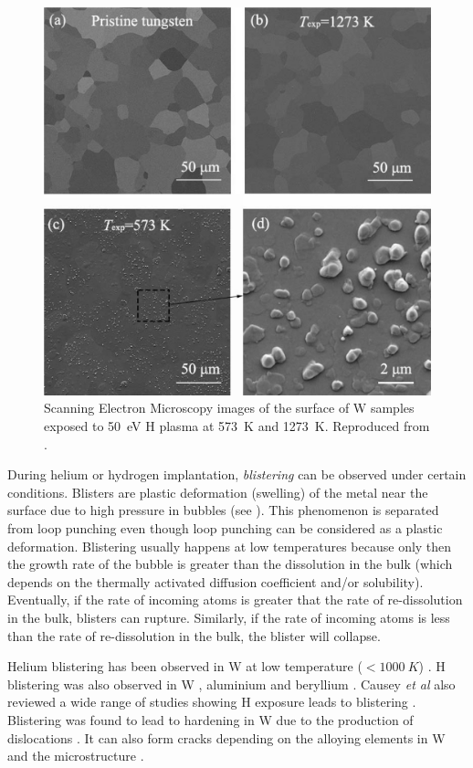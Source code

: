 \begin{figure}
    \centering
    \includegraphics[width=\linewidth]{Figures/Chapter1/h_blisters_in_tungsten.jpg}
    \caption{Scanning Electron Microscopy images of the surface of W samples exposed to \SI{50}{eV} H plasma at \SI{573}{K} and \SI{1273}{K}. Reproduced from \cite{chen_irradiation_2019}.}
\end{figure}

During helium or hydrogen implantation, \textit{blistering} can be observed under certain conditions.
Blisters are plastic deformation (swelling) of the metal near the surface due to high pressure in bubbles (see ).
This phenomenon is separated from loop punching even though loop punching can be considered as a plastic deformation.
Blistering usually happens at low temperatures because only then the growth rate of the bubble is greater than the dissolution in the bulk (which depends on the thermally activated diffusion coefficient and/or solubility).
Eventually, if the rate of incoming atoms is greater that the rate of re-dissolution in the bulk, blisters can rupture.
Similarly, if the rate of incoming atoms is less than the rate of re-dissolution in the bulk, the blister will collapse.

Helium blistering has been observed in W at low temperature ($< \SI{1000}{K}$) .
H blistering was also observed in W , aluminium and beryllium .
Causey \textit{et al} also reviewed a wide range of studies showing H exposure leads to blistering .
Blistering was found to lead to hardening in W due to the production of dislocations .
It can also form cracks depending on the alloying elements in W and the microstructure .

